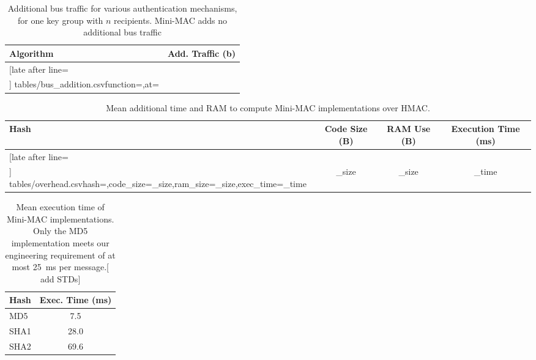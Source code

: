 	
	\begin{table}
	\centering
	\caption{Additional bus traffic for various authentication mechanisms, 
	for one key group with $n$ recipients.  Mini-MAC adds no additional bus traffic}
	\label{tab-traffic}
	\vspace{8pt}
	\begin{tabular}{l|c}%
	\bfseries Algorithm & \bfseries Add. Traffic (b) \\\hline \csvreader[late after line=\\]%
		{tables/bus_addition.csv}{function=\function,at=\at}%
		{\function & \at}%
	\end{tabular}
	\end{table}

	\begin{table}	
	\centering	
	\caption{Mean additional time and RAM to compute Mini-MAC implementations over HMAC.}
	\label{tab-overhead}
	\vspace{8pt}
	\begin{tabular}{l|c|c|c}%
	\bfseries Hash & \bfseries Code Size (B) & \bfseries RAM Use (B) & \bfseries Execution Time (ms)\\\hline \csvreader[late after line=\\]%
		{tables/overhead.csv}{hash=\hash,code_size=\code_size,ram_size=\ram_size,exec_time=\exec_time}%
		{\hash & \code_size & \ram_size & \exec_time}%
	\end{tabular}
	\end{table}
	
	\begin{table}
	\centering
	\caption{Mean execution time of Mini-MAC implementations.
	Only the MD5 implementation meets our engineering requirement of at most 25~ms per message.[ add STDs]}
	\label{tab-time}
	\vspace{8pt}
	\begin{tabular}{ @{}l | S[table-format=2.1]  @{}}
		\hspace{2pt}\textbf{Hash} & {\textbf{Exec. Time (ms)}} \\
		\hline 
		\hspace{2pt}MD5 & 7.5 \\
		\hspace{2pt}SHA1 & 28.0 \\
		\hspace{2pt}SHA2 & 69.6 \\ 
	\end{tabular}	
	\end{table}
	
